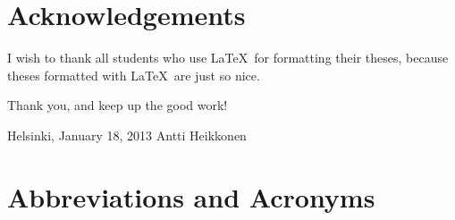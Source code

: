 \documentclass[12pt,a4paper,oneside,pdftex]{report}
\newcommand{\DATE}{January 18, 2013}
\newcommand{\AUTHOR}{Antti Heikkonen}
\begin{document}



\chapter*{Acknowledgements}

I wish to thank all students who use \LaTeX\ for formatting their theses,
because theses formatted with \LaTeX\ are just so nice.

Thank you, and keep up the good work!
\vskip 10mm

\noindent Helsinki, \DATE
\vskip 5mm
\noindent\AUTHOR

\cleardoublepage
% 

\chapter*{Abbreviations and Acronyms}

\end{document}

